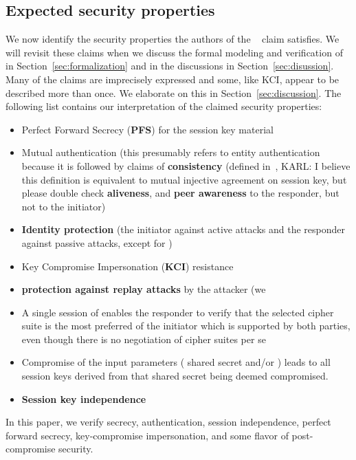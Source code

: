 \subsection{Expected security properties}
\label{sec:claimedProperties}
We now identify the security properties the authors
of the \mSpec{}~\cite{selander-lake-edhoc-01} claim \mEdhoc{} satisfies.
%
We will revisit these claims when we discuss the formal modeling and
verification of \mEdhoc{} in Section~\ref{sec:formalization} and in the
discussions in Section~\ref{sec:disussion}.
%
Many of the claims are imprecisely expressed and some, like KCI, appear to be
described more than once.
%
We elaborate on this in Section~\ref{sec:discussion}.
%
The following list contains our interpretation of the claimed security
properties:
\begin{itemize}
    \item Perfect Forward Secrecy (\textbf{PFS}) for the session key material
    \item Mutual authentication (this presumably refers to entity authentication
        because it is followed by claims of
        \textbf{consistency} (defined in~\cite{sigma}, {\color{red} KARL: I
            believe this definition is equivalent to mutual injective agreement
            on session key, but please double check}
        \textbf{aliveness}, and
        \textbf{peer awareness} to the responder, but not to the initiator)
    \item \textbf{Identity protection} (the initiator against active attacks
        and the responder against passive attacks, except for \mPskPsk{})
    \item Key Compromise Impersonation (\textbf{KCI}) resistance
    \item \textbf{protection against replay attacks} by the attacker (we
    \item A single session of \mEdhoc{} enables the responder to verify
            that the selected cipher suite is the most preferred of the
            initiator which is supported by both parties, even though there is
            no negotiation of cipher suites per se
    \item Compromise of the \mHkdf{} input parameters (\mGxy{} shared
            secret and/or \mPsk) leads to all session keys derived from that
            shared secret being deemed compromised.
        \item \textbf{Session key independence}
\end{itemize}
%
In this paper, we verify {\color{red} secrecy, authentication, session independence,
perfect forward secrecy, key-compromise impersonation, and some
flavor of post-compromise security.}
%
